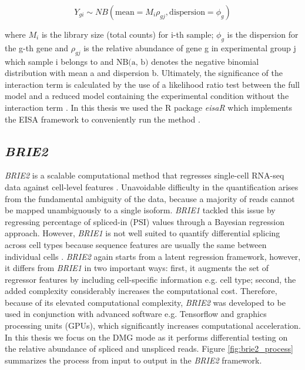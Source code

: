 \begin{equation}
Y_{gi} \sim NB(\text{mean} = M_{i}\rho_{gj}, \text{dispersion} = \phi_g)
\label{eqn:edger}
\end{equation}

where $M_i$ is the library size (total counts) for i-th sample; $\phi_g$ is the dispersion for the g-th gene and $\rho_{gj}$ is the relative abundance of gene g in experimental group j which sample i belongs to and $\text{NB(a, b)}$ denotes the negative binomial distribution with mean a and dispersion b. Ultimately, the significance of the interaction term is calculated by the use of a likelihood ratio test between the full model and a reduced model containing the experimental condition without the interaction term \citep{eisar}. In this thesis we used the R package \emph{eisaR} which implements the EISA framework to conveniently run the method \citep{eisar_package}.

\subsection{\emph{BRIE2}}
\emph{BRIE2} is a scalable computational method that regresses single-cell RNA-seq data against cell-level features \citep{brie2}. Unavoidable difficulty in the quantification arises from the fundamental ambiguity of the data, because a majority of reads cannot be mapped unambiguously to a single isoform. \emph{BRIE1} tackled this issue by regressing percentage of spliced-in (PSI) values through a Bayesian regression approach. However, \emph{BRIE1} is not well suited to quantify differential splicing across cell types because sequence features are usually the same between individual cells \citep{brie2}. \emph{BRIE2} again starts from a latent regression framework, however, it differs from \emph{BRIE1} in two important ways: first, it augments the set of regressor features by including cell-specific information e.g. cell type; second, the added complexity considerably increases the computational cost. Therefore, because of its elevated computational complexity, \emph{BRIE2} was developed to be used in conjunction with advanced software e.g. Tensorflow and graphics processing units (GPUs), which significantly increases computational acceleration. In this thesis we focus on the DMG mode as it performs differential testing on the relative abundance of spliced and unspliced reads. Figure \ref{fig:brie2_process} summarizes the process from input to output in the \emph{BRIE2} framework.

